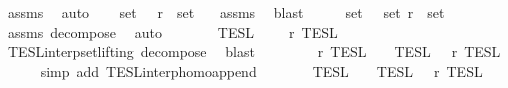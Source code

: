 \begin{isabellebody}
\ assms\ \isamarkupfalse%
\ auto\isanewline
\ \ \isamarkupfalse%
\ {\isacartoucheopen}set\ {\isacharparenleft}{\isasymPhi}\ {\isacharat}\ {\isasymPhi}\isactrlsub r{\isacharparenright}\ {\isacharequal}\ set\ {\isasymPhi}{\isacharprime}{\isacartoucheclose}\ \isamarkupfalse%
\ assms\ \isamarkupfalse%
\ blast\isanewline
\ \ \isamarkupfalse%
\ \isamarkupfalse%
\ {\isacartoucheopen}{\isacharparenleft}set\ {\isasymPhi}{\isacharparenright}\ {\isasymunion}\ {\isacharparenleft}set\ {\isasymPhi}\isactrlsub r{\isacharparenright}\ {\isacharequal}\ set\ {\isasymPhi}{\isacharprime}{\isacartoucheclose}\isanewline
\ \ \ \ \isamarkupfalse%
\ assms\ decompose\ \isamarkupfalse%
\ auto\isanewline
\ \ \isamarkupfalse%
\ \isamarkupfalse%
\ {\isacartoucheopen}{\isasymlbrakk}{\isasymlbrakk}\ {\isasymPhi}{\isacharprime}\ {\isasymrbrakk}{\isasymrbrakk}\isactrlsub T\isactrlsub E\isactrlsub S\isactrlsub L\ {\isacharequal}\ {\isasymlbrakk}{\isasymlbrakk}\ {\isasymPhi}\ {\isacharat}\ {\isasymPhi}\isactrlsub r\ {\isasymrbrakk}{\isasymrbrakk}\isactrlsub T\isactrlsub E\isactrlsub S\isactrlsub L{\isacartoucheclose}\isanewline
\ \ \ \ \isamarkupfalse%
\ TESL{\isacharunderscore}interp{\isacharunderscore}set{\isacharunderscore}lifting\ decompose\ \isamarkupfalse%
\ blast\isanewline
\ \ \isamarkupfalse%
\ \isamarkupfalse%
\ {\isacartoucheopen}{\isasymlbrakk}{\isasymlbrakk}\ {\isasymPhi}\ {\isacharat}\ {\isasymPhi}\isactrlsub r\ {\isasymrbrakk}{\isasymrbrakk}\isactrlsub T\isactrlsub E\isactrlsub S\isactrlsub L\ {\isacharequal}\ {\isasymlbrakk}{\isasymlbrakk}\ {\isasymPhi}\ {\isasymrbrakk}{\isasymrbrakk}\isactrlsub T\isactrlsub E\isactrlsub S\isactrlsub L\ {\isasyminter}\ {\isasymlbrakk}{\isasymlbrakk}\ {\isasymPhi}\isactrlsub r\ {\isasymrbrakk}{\isasymrbrakk}\isactrlsub T\isactrlsub E\isactrlsub S\isactrlsub L{\isacartoucheclose}\isanewline
\ \ \ \ \isamarkupfalse%
\ {\isacharparenleft}simp\ add{\isacharcolon}\ TESL{\isacharunderscore}interp{\isacharunderscore}homo{\isacharunderscore}append{\isacharparenright}\isanewline
\ \ \isamarkupfalse%
\ \isamarkupfalse%
\ {\isacartoucheopen}{\isasymlbrakk}{\isasymlbrakk}\ {\isasymPhi}\ {\isasymrbrakk}{\isasymrbrakk}\isactrlsub T\isactrlsub E\isactrlsub S\isactrlsub L\ {\isasymsupseteq}\ {\isasymlbrakk}{\isasymlbrakk}\ {\isasymPhi}\ {\isasymrbrakk}{\isasymrbrakk}\isactrlsub T\isactrlsub E\isactrlsub S\isactrlsub L\ {\isasyminter}\ {\isasymlbrakk}{\isasymlbrakk}\ {\isasymPhi}\isactrlsub r\ {\isasymrbrakk}{\isasymrbrakk}\isactrlsub T\isactrlsub E\isactrlsub S\isactrlsub L{\isacartoucheclose}\ \isamarkupfalse%

\end{isabellebody}
